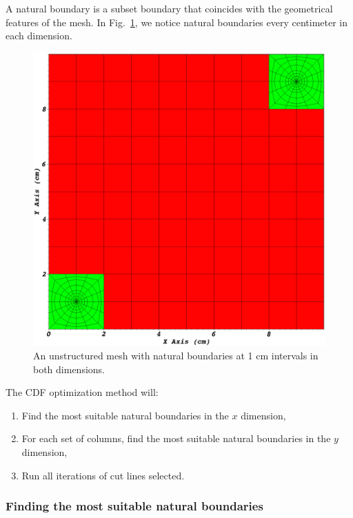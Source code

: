 \documentclass[times,final]{elsarticle}
\begin{document}
A natural boundary is a subset boundary that coincides with the geometrical features of the mesh. In Fig.~\ref{natural_boundary_example}, we notice natural boundaries every centimeter in each dimension.
 \begin{figure}[h]
\centering
\includegraphics[scale=0.2]{../figures/spiderweb_10x10_sparse.png}
\caption{An unstructured mesh with natural boundaries at 1 cm intervals in both dimensions.}
\label{natural_boundary_example}
\end{figure}

The CDF optimization method will:
\begin{enumerate}
  \item Find the most suitable natural boundaries in the $x$ dimension,
  \item For each set of columns, find the most suitable natural boundaries in the $y$ dimension,
  \item Run all iterations of cut lines selected.
\end{enumerate}

\subsubsection{Finding the most suitable natural boundaries}
\end{document}
